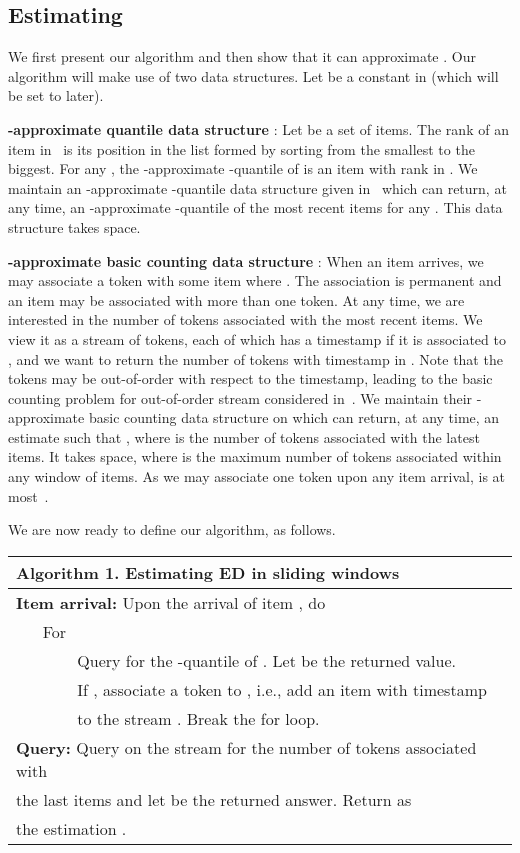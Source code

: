 \documentclass{llncs}
\begin{document}
\subsection{Estimating }
We first present our algorithm and then show that it
can approximate . Our algorithm will
make use of two data structures.
Let  be a constant in  (which will be
set to  later).

{\bf -approximate quantile data structure
\boldmath }:
Let  be a set of items. The rank of an item in~
is its position in the list formed by sorting 
from the smallest to the biggest. For any ,
the -approximate -quantile of 
is an item with rank in .
We maintain an -approximate -quantile
data structure given in~\cite{LLX+04} which
can return, at any time, an -approximate
-quantile of the most recent  items
for any .
This data structure takes
 space.

{\bf -approximate basic counting data structure \boldmath}:
When an item  arrives, we may
associate a token with some item 
where . The association is permanent and
an item may be associated with more than one token.
At any time, we are interested in the number
of tokens associated with the most recent  items.
We view it as a stream  of tokens,
each of which has a timestamp  if it is associated to ,
and we want to return the number of tokens with timestamp in .
Note that the tokens may be out-of-order with respect to the timestamp,
leading to the basic counting problem for out-of-order stream
considered in~\cite{CKT08}.
We maintain their -approximate basic counting data structure
on  which can return, at any time, an estimate 
such that , where
 is the number of tokens associated with
the latest  items.
It takes
 space,
where  is the maximum number of tokens associated within
any window of  items.
As we may associate one token upon any
item arrival,  is at most~. 

We are now ready to define our algorithm, as follows.
\begin{center}
\vspace{-.1in}
  \begin{tabular}{l}
    \hline
    {\bf Algorithm 1.} Estimating ED in sliding windows\\
    \hline
    {\bf Item arrival:} Upon the arrival of item , do \\
    ~ ~ For \\
    ~ ~ ~ ~ ~Query  for the -quantile of .
             Let  be the returned value.\\
    ~ ~ ~ ~ ~If ,
    associate a token to , i.e., add an item with timestamp \\
    ~ ~ ~ ~ ~to the stream .
                  Break the for loop. \vspace{.1in}\\
   {\bf Query:}
   Query  on the stream  for the number of tokens associated
   with\\
   the last  items and
   let  be the returned answer.
   Return  as\\
   the estimation .   \\
    \hline
  \end{tabular}
\end{center}
\end{document}
